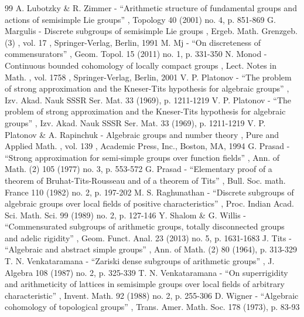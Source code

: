 \documentclass[11pt]{article}
\numberwithin{equation}{section}\providecommand{\llangle}{\langle\!\langle}\providecommand{\rrangle}{\rangle\!\rangle}\providecommand{\Asterisk}{\ast}
\theoremstyle{definition}
\begin{document}
\begin{thebibliography}{99}
 A. Lubotzky \& R. Zimmer - “Arithmetic structure of fundamental groups and actions of semisimple Lie groups” , Topology 40 (2001) no. 4, p. 851-869
 G. Margulis - Discrete subgroups of semisimple Lie groups , Ergeb. Math. Grenzgeb. (3) , vol. 17 , Springer-Verlag, Berlin, 1991
 M. Mj - “On discreteness of commensurators” , Geom. Topol. 15 (2011) no. 1, p. 331-350
 N. Monod - Continuous bounded cohomology of locally compact groups , Lect. Notes in Math. , vol. 1758 , Springer-Verlag, Berlin, 2001
 V. P. Platonov - “The problem of strong approximation and the Kneser-Tits hypothesis for algebraic groups” , Izv. Akad. Nauk SSSR Ser. Mat. 33 (1969), p. 1211-1219
 V. P. Platonov - “The problem of strong approximation and the Kneser-Tits hypothesis for algebraic groups” , Izv. Akad. Nauk SSSR Ser. Mat. 33 (1969), p. 1211-1219
 V. P. Platonov \& A. Rapinchuk - Algebraic groups and number theory , Pure and Applied Math. , vol. 139 , Academic Press, Inc., Boston, MA, 1994
 G. Prasad - “Strong approximation for semi-simple groups over function fields” , Ann. of Math. (2) 105 (1977) no. 3, p. 553-572
 G. Prasad - “Elementary proof of a theorem of Bruhat-Tits-Rousseau and of a theorem of Tits” , Bull. Soc. math. France 110 (1982) no. 2, p. 197-202
 M. S. Raghunathan - “Discrete subgroups of algebraic groups over local fields of positive characteristics” , Proc. Indian Acad. Sci. Math. Sci. 99 (1989) no. 2, p. 127-146
 Y. Shalom \& G. Willis - “Commensurated subgroups of arithmetic groups, totally disconnected groups and adelic rigidity” , Geom. Funct. Anal. 23 (2013) no. 5, p. 1631-1683
 J. Tits - “Algebraic and abstract simple groups” , Ann. of Math. (2) 80 (1964), p. 313-329
 T. N. Venkataramana - “Zariski dense subgroups of arithmetic groups” , J. Algebra 108 (1987) no. 2, p. 325-339
 T. N. Venkataramana - “On superrigidity and arithmeticity of lattices in semisimple groups over local fields of arbitrary characteristic” , Invent. Math. 92 (1988) no. 2, p. 255-306
 D. Wigner - “Algebraic cohomology of topological groups” , Trans. Amer. Math. Soc. 178 (1973), p. 83-93
\end{thebibliography}
\end{document}
